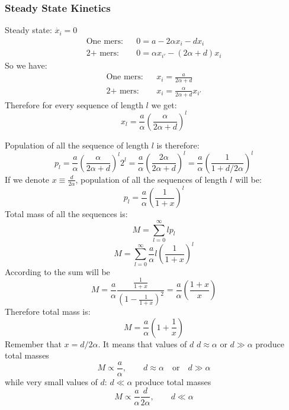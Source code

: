 \documentclass[journal=jacsat,manuscript=article,layout=twocolumn]{achemso}
\newcommand*{\ga}{\alpha}
\newcommand*{\pt}[1]{\left( #1\right)}
\begin{document}
\subsubsection{Steady State Kinetics}\label{sec:nowak-steady}
Steady state: $\dot{x_i}=0$
  \begin{eqnarray}
   \mbox{One mers:}&& 0=a-2\ga x_i-dx_i \\
     \mbox{2+ mers:}&& 0=\ga x_{i'}-(2\ga+d)x_i
  \end{eqnarray}
  So we have:
   \begin{eqnarray}
   \mbox{One mers:}&& x_i=\frac{a}{2\ga+d} \\
     \mbox{2+ mers:}&& x_i=\frac{\ga}{2\ga+d}x_{i'}
  \end{eqnarray}   
 Therefore for every sequence of length $l$ we get:
   \begin{equation}
   \boxed{ x_l=\frac{a}{\ga}\pt{\frac{\ga}{2\ga+d}}^l}
   \end{equation} 

Population of all the sequence of length $l$ is therefore:
  \begin{equation}
    p_l=\frac{a}{\ga}\pt{\frac{\ga}{2\ga+d}}^l2^l=\frac{a}{\ga}\pt{\frac{2\ga}{2\ga+d}}^l=
    \frac{a}{\ga}\pt{\frac{1}{1+d/2\ga}}^l
  \end{equation} 
If we denote $x\equiv\frac{d}{2\ga}$, population of all the sequences of length $l$ will be:
\begin{equation}
\boxed{ p_l=\frac{a}{\ga}\pt{\frac{1}{1+x}}^l}
\end{equation} 
Total mass of all the sequences is:
\begin{equation}
 M=\sum_{l=0}^{\infty}lp_l
\end{equation} 
\begin{equation}
 M=\sum_{l=0}^{\infty}\frac{a}{\ga}l\pt{\frac{1}{1+x}}^l
\end{equation} 
According to \cite{Gradstein1980} the sum will be
\begin{equation}
 M=\frac{a}{\ga}\frac{\frac{1}{1+x}}{\pt{1-\frac{1}{1+x}}^2}=\frac{a}{\ga}\pt{\frac{1+x}{x}}
\end{equation}
Therefore total mass is:
  \begin{equation}
   M=\frac{a}{\ga}\pt{1+\frac{1}{x}}
  \end{equation} 
Remember that $x=d/2\ga$. It means that values of $d$ $d\approx \ga$ or $d\gg \ga$ produce total 
masses 
\begin{equation}
 M\propto\frac{a}{\ga}, \qquad d\approx \ga\quad \mbox{or}\quad d\gg \ga
\end{equation} 
while very small values of $d:\,d\ll\ga$ produce total masses 
\begin{equation}
M\propto \frac{a}{\ga}\frac{d}{2\ga} ,\qquad d\ll\ga
\end{equation}



 

\end{document}

